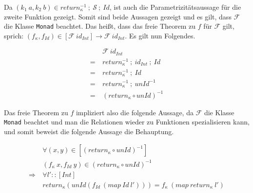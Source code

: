 Da $(k_1\ a, k_2\ b) \in return_{\kappa}^{-1}~;~\mathcal{S}~;~Id$, ist auch die Parametrizitätsaussage für die zweite Funktion
gezeigt. Somit sind beide Aussagen gezeigt und es gilt, dass $\mathcal{F}$ die Klasse \texttt{Monad} beachtet. Das heißt, dass
das freie Theorem zu $f$ für $\mathcal{F}$ gilt, sprich: $(f_{\kappa}, f_{Id}) \in [\mathcal{F}\ id_{Int}] \rightarrow \mathcal{F}\ 
id_{Int}$. Es gilt nun Folgendes.

\begin{align*}
& \mathcal{F}\ id_{Int} \\
=~& return_{\kappa}^{-1}~;~id_{Int}~;~Id \\
=~& return_{\kappa}^{-1}~;~Id \\
=~& return_{\kappa}^{-1}~;~unId^{-1} \\
=~& (return_{\kappa} \circ unId)^{-1}
\end{align*}

Das freie Theorem zu $f$ impliziert also die folgende Aussage, da $\mathcal{F}$ die Klasse \texttt{Monad} beachtet und man
die Relationen wieder zu Funktionen spezialisieren kann, und somit beweist die folgende Aussage die Behauptung.

\begin{align*}
& \forall (x, y) \in [(return_{\kappa} \circ unId)^{-1}] \\
& (f_{\kappa}\ x, f_{Id}\ y) \in (return_{\kappa} \circ unId)^{-1} \\
\Rightarrow~& \forall l' :: [Int] \\
& return_{\kappa} (unId (f_{Id}\ (map\ Id\ l'))) = f_{\kappa}\ (map\ return_{\kappa}\ l')
\end{align*}


